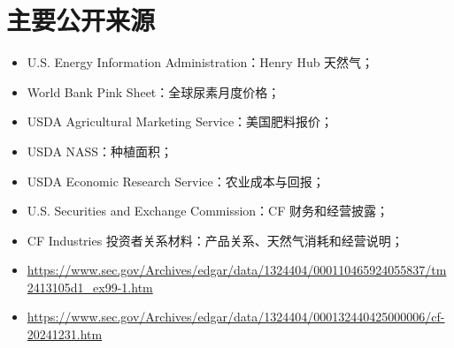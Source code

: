 \documentclass[11pt,a4paper]{ctexart}
\begin{document}
\section*{主要公开来源}

\begin{itemize}
  \item U.S. Energy Information Administration：Henry Hub 天然气；
  \item World Bank Pink Sheet：全球尿素月度价格；
  \item USDA Agricultural Marketing Service：美国肥料报价；
  \item USDA NASS：种植面积；
  \item USDA Economic Research Service：农业成本与回报；
  \item U.S. Securities and Exchange Commission：CF 财务和经营披露；
  \item CF Industries 投资者关系材料：产品关系、天然气消耗和经营说明；
  \item \url{https://www.sec.gov/Archives/edgar/data/1324404/000110465924055837/tm2413105d1_ex99-1.htm}
  \item \url{https://www.sec.gov/Archives/edgar/data/1324404/000132440425000006/cf-20241231.htm}
\end{itemize}
\end{document}
